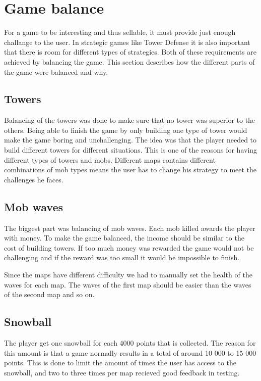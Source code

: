 \section{Game balance}

For a game to be interesting and thus sellable, it must provide just enough challange to the user. In strategic games like Tower Defense it is also important that there is room for different types of strategies. Both of these requirements are achieved by balancing the game. This section describes how the different parts of the game were balanced and why.

\subsection{Towers}

Balancing of the towers was done to make sure that no tower was superior to the others. Being able to finish the game by only building one type of tower would make the game boring and unchallenging. The idea was that the player needed to build different towers for different situations. This is one of the reasons for having different types of towers and mobs. Different maps contains different combinations of mob types means the user has to change his strategy to meet the challenges he faces.
\subsection{Mob waves}

The biggest part was balancing of mob waves. Each mob killed awards the player with money. To make the game balanced, the income should be similar to the cost of building towers. If too much money was rewarded the game would not be challenging and if the reward was too small it would be impossible to finish.

Since the maps have different difficulty we had to manually set the health of the waves for each map. The waves of the first map should be easier than the waves of the second map and so on. 
\subsection{Snowball}

The player get one snowball for each 4000 points that is collected. The reason for this amount is that a game normally results in a total of around 10 000 to 15 000 points. This is done to limit the amount of times the user has access to the snowball, and two to three times per map recieved good feedback in testing.

